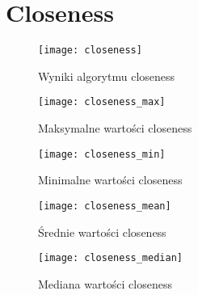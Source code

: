 \section{Closeness}
\FloatBarrier
\begin{figure}[h]
	\centering
	\texttt{[image: closeness]}
	\caption{Wyniki algorytmu closeness}
\end{figure}
\FloatBarrier\FloatBarrier
\begin{figure}[h]
	\centering
	\texttt{[image: closeness\_max]}
	\caption{Maksymalne wartości closeness}
\end{figure}
\FloatBarrier\FloatBarrier
\begin{figure}[h]
	\centering
	\texttt{[image: closeness\_min]}
	\caption{Minimalne wartości closeness}
\end{figure}
\FloatBarrier\FloatBarrier
\begin{figure}[h]
	\centering
	\texttt{[image: closeness\_mean]}
	\caption{Średnie wartości closeness}
\end{figure}
\FloatBarrier\FloatBarrier
\begin{figure}[h]
	\centering
	\texttt{[image: closeness\_median]}
	\caption{Mediana wartości closeness}
\end{figure}
\FloatBarrier
\newpage
